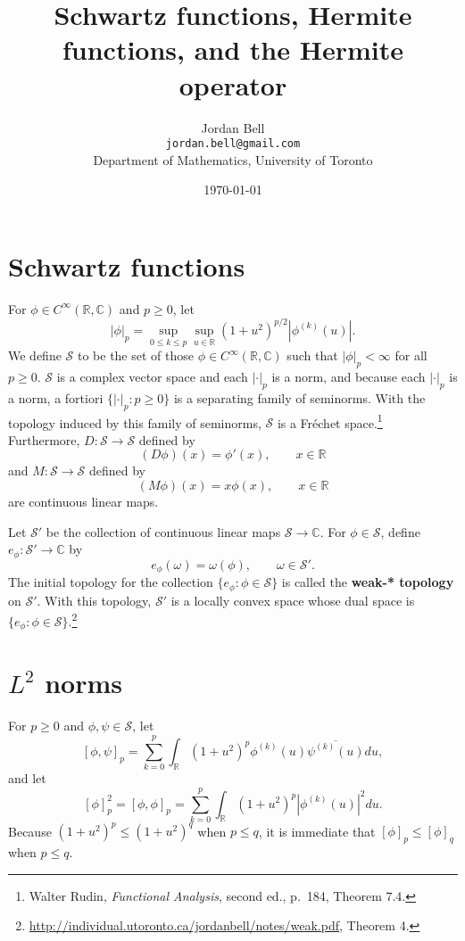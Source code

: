 \documentclass{article}
\theoremstyle{definition}
\begin{document}
\title{Schwartz functions, Hermite functions, and the Hermite operator}
\author{Jordan Bell\\ \texttt{jordan.bell@gmail.com}\\Department of Mathematics, University of Toronto}
\date{\today}

\maketitle


\section{Schwartz functions}
For $\phi \in C^\infty(\mathbb{R},\mathbb{C})$ and $p \geq 0$,
let 
\[
|\phi|_p =\sup_{0 \leq k \leq p} \sup_{u \in \mathbb{R}} (1+u^2)^{p/2} |\phi^{(k)}(u)|.
\]
We define $\mathscr{S}$ to be the set of those 
$\phi \in C^\infty(\mathbb{R},\mathbb{C})$ such that $|\phi|_p<\infty$ for all $p \geq 0$. 
$\mathscr{S}$ is a complex vector space 
and each $|\cdot|_p$ is a norm, and
because each $|\cdot|_p$ is a norm, a fortiori $\{|\cdot|_p:  p \geq 0\}$ is a separating family of seminorms.
With the topology induced by this family of seminorms, $\mathscr{S}$ is a Fr\'echet space.\footnote{Walter
Rudin, {\em Functional Analysis}, second ed., p.~184, Theorem 7.4.}
Furthermore, $D:\mathscr{S} \to \mathscr{S}$ defined by
\[
(D\phi)(x) = \phi'(x),\qquad x \in \mathbb{R}
\]
and $M:\mathscr{S} \to \mathscr{S}$ defined by
\[
(M\phi)(x) = x\phi(x),\qquad x \in \mathbb{R}
\]
are continuous linear maps. 

Let $\mathscr{S}'$ be the collection of continuous linear maps $\mathscr{S}
\to \mathbb{C}$.
For $\phi \in \mathscr{S}$, define $e_\phi:\mathscr{S}' \to \mathbb{C}$ by
\[
e_\phi(\omega) = \omega(\phi), \qquad \omega \in \mathscr{S}'.
\]
The initial topology for the collection
$\{e_\phi: \phi \in \mathscr{S}\}$ is called the \textbf{weak-* topology} on $\mathscr{S}'$. 
With this topology, $\mathscr{S}'$ is a locally convex space whose dual space
is $\{e_\phi: \phi \in \mathscr{S}\}$.\footnote{\url{http://individual.utoronto.ca/jordanbell/notes/weak.pdf},
Theorem 4.}



\section{$L^2$ norms}
\label{L2norms}
For $p \geq 0$ and $\phi,\psi \in \mathscr{S}$, let 
\[
[\phi,\psi]_p = \sum_{k=0}^p \int_{\mathbb{R}} (1+u^2)^{p} \phi^{(k)}(u)  \overline{\psi^{(k)}(u)} du,
\]
and let
\[
[\phi]_p^2 = [\phi,\phi]_p=  \sum_{k=0}^p \int_{\mathbb{R}} (1+u^2)^p |\phi^{(k)}(u)|^2 du.
\]
Because $(1+u^2)^p \leq (1+u^2)^q$ when $p \leq q$, it is immediate that
$[\phi]_p \leq [\phi]_q$ when $p \leq q$. 
\end{document}
